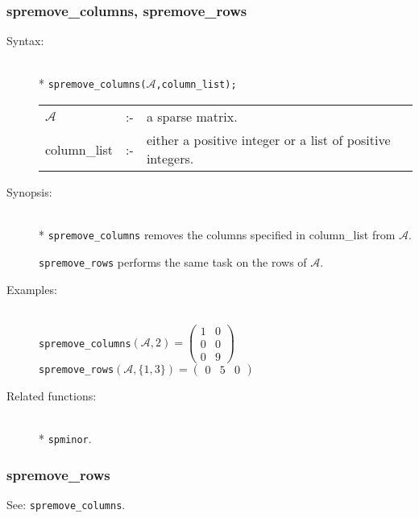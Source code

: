 \subsubsection{spremove\_columns, spremove\_rows}
\label{sparse:spremove_columns}
\hypertarget{operator:SPREMOVE_COLUMNS}{}

\begin{description}
\item[Syntax:]\mbox{}\\*
\texttt{spremove\_columns($\mathcal{A}$,column\_list);}\\[2mm]
\begin{tabular}{l l l}
$\mathcal{A}$   &:-& a sparse matrix. \\
column\_list &:-& either a positive integer or a list of
                  positive integers.
\end{tabular}

\item[Synopsis:]\mbox{}\\*
\texttt{spremove\_columns} removes the columns specified in
                column\_list from $\mathcal{A}$.

\texttt{spremove\_rows} performs the same task on the rows
                of $\mathcal{A}$.

\item[Examples:]\mbox{}\\
\texttt{spremove\_columns}\((\mathcal{A},2) =
        \begin{pmatrix} 1 & 0 \\ 0 & 0 \\ 0 & 9  \end{pmatrix}\) \\[2mm]
\texttt{spremove\_rows}\((\mathcal{A},\{1,3\}) =
        \begin{pmatrix} 0 & 5 & 0 \end{pmatrix}\)


\item[Related functions:]\mbox{}\\*
\texttt{spminor}.
\end{description}

\subsubsection{spremove\_rows}
\label{sparse:spremove_rows}
\hypertarget{operator:SPREMOVE_ROWS}{}

See: \texttt{spremove\_columns}.


